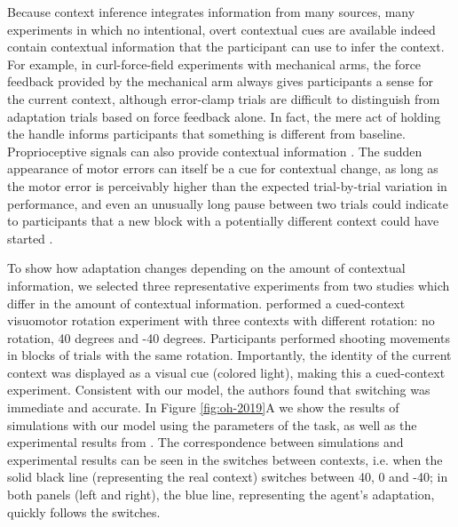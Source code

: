 \documentclass[a4paper,doc,floatsintext,natbib]{apa6}
\def \fref #1{Figure \ref{#1}}     %
\begin{document}
Because context inference integrates information from many sources, many experiments in which no intentional, overt contextual cues are available indeed contain contextual information that the participant can use to infer the context. For example, in curl-force-field experiments with mechanical arms, the force feedback provided by the mechanical arm always gives participants a sense for the current context, although error-clamp trials are difficult to distinguish from adaptation trials based on force feedback alone. In fact, the mere act of holding the handle informs participants that something is different from baseline. Proprioceptive signals can also provide contextual information \cite{Dizio_Motor_1995,Shadmehr_Adaptive_1994}. The sudden appearance of motor errors can itself be a cue for contextual change, as long as the motor error is perceivably higher than the expected trial-by-trial variation in performance, and even an unusually long pause between two trials could indicate to participants that a new block with a potentially different context could have started \cite{Ethier_Spontaneous_2008}.

To show how adaptation changes depending on the amount of contextual information, we selected three representative experiments from two studies \cite{Kim_Neural_2015,Oh_Minimizing_2019} which differ in the amount of contextual information. \cite{Kim_Neural_2015} performed a cued-context visuomotor rotation experiment with three contexts with different rotation: no rotation, 40 degrees and -40 degrees. Participants performed shooting movements in blocks of trials with the same rotation. Importantly, the identity of the current context was displayed as a visual cue (colored light), making this a cued-context experiment. Consistent with our model, the authors found that switching was immediate and accurate. In \fref{fig:oh-2019}A we show the results of simulations with our model using the parameters of the task, as well as the experimental results from \cite{Kim_Neural_2015}. The correspondence between simulations and experimental results can be seen in the switches between contexts, i.e. when the solid black line (representing the real context) switches between 40, 0 and -40; in both panels (left and right), the blue line, representing the agent's adaptation, quickly follows the switches.
\end{document}
